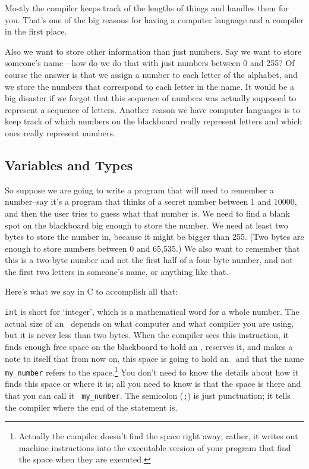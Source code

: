     Mostly the compiler keeps track of the lengths of things and handles
them for you.  That's one of the big reasons for having a computer
language and a compiler in the first place.

    Also we want to store other information than just numbers.  Say we
want to store someone's name---how do we do that with just numbers
between 0 and 255?  Of course the answer is that we assign a number to
each letter of the alphabet, and we store the numbers that correspond to
each letter in the name.  It would be a big disaster if we forgot that
this sequence of numbers was actually supposed to represent a sequence
of letters.  Another reason we have computer languages is to keep track
of which numbers on the blackboard really represent letters and which
ones really represent numbers.

\subsection{Variables and Types}

    So suppose we are going to write a program that will need to
remember a number--say it's a program that thinks of a secret number
between 1 and 10000, and then the user tries to guess what that number
is.  We need to find a blank spot on the blackboard big enough to store
the number.  We need at least two bytes to store the number in, because
it might be bigger than 255.  (Two bytes are enough to store numbers
between 0 and 65,535.)  We also want to remember that this is a two-byte
number and not the first half of a four-byte number, and not the first
two letters in someone's name, or anything like that.

    Here's what we say in C to accomplish all that:

\begin{flushleft}
\verb%    int my_number;%
\end{flushleft}

    {\tt int} is short for `integer', which is a mathematical word for a
whole number.  The actual size of an \int\ depends on what computer
and what compiler you are using, but it is never less than two bytes.
When the compiler sees this instruction, it finds enough free space on
the blackboard to hold an \int, reserves it, and makes a note to
itself that from now on, this space is going to hold an \int\ and
that the name {\tt my\_number} refers to the space.\footnote{Actually the
compiler doesn't find the space right away; rather, it writes out
machine instructions into the executable version of your program that
find the space when they are executed.} You don't need to know the
details about how it finds this space or where it is; all you need to
know is that the space is there and that you can call it {\tt
my\_number}.  The semicolon ({\tt;}) is just punctuation; it tells the
compiler where the end of the statement is.

